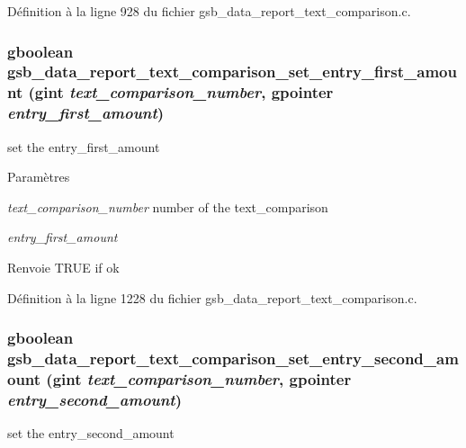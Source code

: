 Définition à la ligne 928 du fichier gsb\_\-data\_\-report\_\-text\_\-comparison.c.

\subsubsection[{gsb\_\-data\_\-report\_\-text\_\-comparison\_\-set\_\-entry\_\-first\_\-amount}]{\setlength{\rightskip}{0pt plus 5cm}gboolean gsb\_\-data\_\-report\_\-text\_\-comparison\_\-set\_\-entry\_\-first\_\-amount (gint {\em text\_\-comparison\_\-number}, \/  gpointer {\em entry\_\-first\_\-amount})}\label{gsb__data__report__text__comparison_8h_af4b8d9bf4d4013e6e50587842f7e507d}
set the entry\_\-first\_\-amount


\begin{DoxyParams}{Paramètres}
\item[{\em text\_\-comparison\_\-number}]number of the text\_\-comparison \item[{\em entry\_\-first\_\-amount}]\end{DoxyParams}
\begin{DoxyReturn}{Renvoie}
TRUE if ok 
\end{DoxyReturn}


Définition à la ligne 1228 du fichier gsb\_\-data\_\-report\_\-text\_\-comparison.c.

\subsubsection[{gsb\_\-data\_\-report\_\-text\_\-comparison\_\-set\_\-entry\_\-second\_\-amount}]{\setlength{\rightskip}{0pt plus 5cm}gboolean gsb\_\-data\_\-report\_\-text\_\-comparison\_\-set\_\-entry\_\-second\_\-amount (gint {\em text\_\-comparison\_\-number}, \/  gpointer {\em entry\_\-second\_\-amount})}\label{gsb__data__report__text__comparison_8h_a07b8ad9d6e19ec0ed1ab6b0e13ca3aff}
set the entry\_\-second\_\-amount


